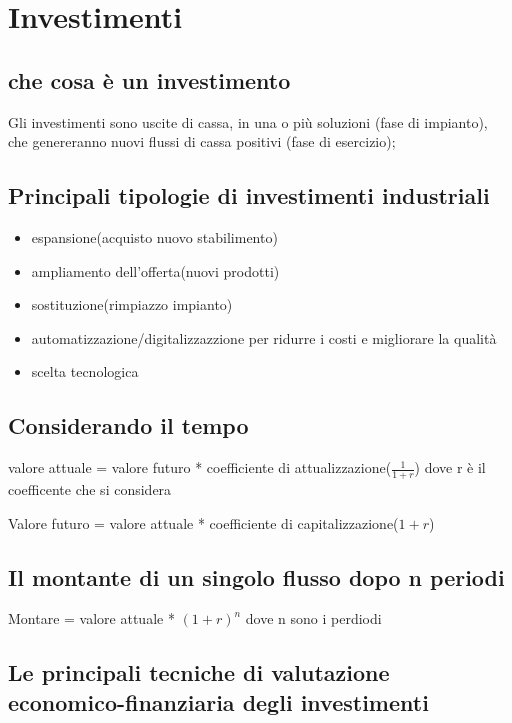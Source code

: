 \section{Investimenti}
\subsection{che cosa è un investimento}



Gli investimenti sono uscite di cassa, in una o più soluzioni
(fase di impianto), che genereranno nuovi flussi di cassa
positivi (fase di esercizio);

\subsection{Principali tipologie di investimenti
industriali}

\begin{itemize}
    \item espansione(acquisto nuovo stabilimento)
    \item ampliamento dell'offerta(nuovi prodotti)
    \item sostituzione(rimpiazzo impianto)
    \item automatizzazione/digitalizzazzione per ridurre i costi e migliorare la qualità
    \item scelta tecnologica
\end{itemize}


\subsection{Considerando il tempo}
valore attuale = valore futuro * coefficiente di attualizzazione($\frac{1}{1 + r}$) dove r è il coefficente che si considera


Valore futuro = valore attuale * coefficiente di capitalizzazione($1 + r$)


\subsection{Il montante di un singolo flusso dopo n
periodi}

Montare = valore attuale * $(1 + r)^n$ dove n sono i perdiodi


\subsection{Le principali tecniche di valutazione
economico-finanziaria degli investimenti}

